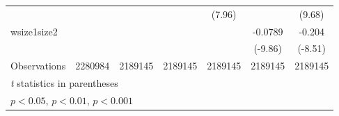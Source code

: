 {\begin{tabular}{l*{6}{c}}
                    &                     &                     &                     &      (7.96)         &                     &      (9.68)         \\
[1em]
wsize1size2         &                     &                     &                     &                     &     -0.0789\sym{***}&      -0.204\sym{***}\\
                    &                     &                     &                     &                     &     (-9.86)         &     (-8.51)         \\
\hline
Observations        &     2280984         &     2189145         &     2189145         &     2189145         &     2189145         &     2189145         \\
\hline\hline
\multicolumn{7}{l}{\footnotesize \textit{t} statistics in parentheses}\\
\multicolumn{7}{l}{\footnotesize \sym{*} \(p<0.05\), \sym{**} \(p<0.01\), \sym{***} \(p<0.001\)}\\
\end{tabular}
}
